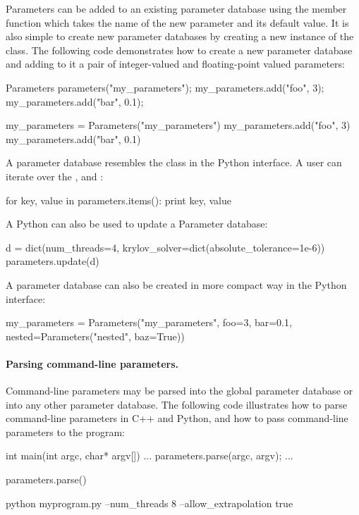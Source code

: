 Parameters can be added to an existing parameter database using the
 member function which takes the name of the new parameter
and its default value. It is also simple to create new parameter
databases by creating a new instance of the 
class. The following code demonstrates how to create a new parameter
database and adding to it a pair of integer-valued and floating-point
valued parameters:
\begin{c++}
Parameters parameters("my_parameters");
my_parameters.add("foo", 3);
my_parameters.add("bar", 0.1);
\end{c++}
\begin{python}
my_parameters = Parameters("my_parameters")
my_parameters.add("foo", 3)
my_parameters.add("bar", 0.1)
\end{python}
A parameter database resembles the  class in the Python
interface. A user can iterate over the ,  and
:
\begin{python}
for key, value in parameters.items():
    print key, value
\end{python}
A Python  can also be used to update a Parameter
database:
\begin{python}
d = dict(num_threads=4, krylov_solver=dict(absolute_tolerance=1e-6))
parameters.update(d)
\end{python}
A parameter database can also be created in more compact way in the
Python interface:
\begin{python}
my_parameters = Parameters("my_parameters", foo=3, bar=0.1,
                           nested=Parameters("nested", baz=True))
\end{python}

\paragraph{Parsing command-line parameters.}

Command-line parameters may be parsed into the global parameter database
or into any other parameter database. The following code illustrates
how to parse command-line parameters in C++ and Python, and how to pass
command-line parameters to the program:
\begin{c++}
int main(int argc, char* argv[])
{
  ...
  parameters.parse(argc, argv);
  ...
}
\end{c++}
\begin{python}
parameters.parse()
\end{python}
\begin{bash}
python myprogram.py --num_threads 8 --allow_extrapolation true
\end{bash}

